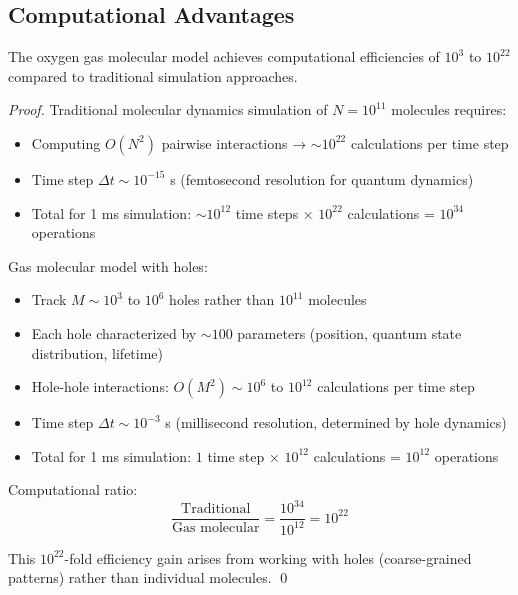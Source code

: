 \subsection{Computational Advantages}

\begin{theorem}
\label{thm:oxygen_efficiency}
The oxygen gas molecular model achieves computational efficiencies of $10^3$ to $10^{22}$ compared to traditional simulation approaches.
\end{theorem}

\begin{proof}
Traditional molecular dynamics simulation of $N = 10^{11}$  molecules requires:
\begin{itemize}
\item Computing $O(N^2)$ pairwise interactions → $\sim 10^{22}$ calculations per time step
\item Time step $\Delta t \sim 10^{-15}$ s (femtosecond resolution for quantum dynamics)
\item Total for 1 ms simulation: $\sim 10^{12}$ time steps × $10^{22}$ calculations = $10^{34}$ operations
\end{itemize}

Gas molecular model with holes:
\begin{itemize}
\item Track $M \sim 10^3$ to $10^6$ holes rather than $10^{11}$ molecules
\item Each hole characterized by $\sim 100$ parameters (position, quantum state distribution, lifetime)
\item Hole-hole interactions: $O(M^2) \sim 10^6$ to $10^{12}$ calculations per time step
\item Time step $\Delta t \sim 10^{-3}$ s (millisecond resolution, determined by hole dynamics)
\item Total for 1 ms simulation: $1$ time step × $10^{12}$ calculations = $10^{12}$ operations
\end{itemize}

Computational ratio:
\begin{equation}
\frac{\text{Traditional}}{\text{Gas molecular}} = \frac{10^{34}}{10^{12}} = 10^{22}
\end{equation}

This $10^{22}$-fold efficiency gain arises from working with holes (coarse-grained patterns) rather than individual molecules. \qed
\end{proof}

